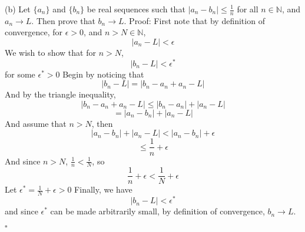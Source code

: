 \documentclass{article}
\begin{document}
(b) Let $\{a_n\}$ and $\{b_n\}$ be real sequences such that $|a_n-b_n| \leq \frac{1}{n}$ for all $n \in \mathbb{N}$, and $a_n \rightarrow L$. Then prove that $b_n \rightarrow L$.
\newline\newline
Proof: First note that by definition of convergence, for $\epsilon > 0$, and $n>N\in \mathbb{N}$,
\[|a_n-L| < \epsilon\]
We wish to show that for $n>N$,
\[|b_n-L| < \epsilon ^*\]
for some $\epsilon ^* > 0$
\newline\newline
Begin by noticing that 
\[|b_n - L| = |b_n - a_n + a_n - L|\]
And by the triangle inequality,
\[|b_n-a_n+a_n-L| \leq |b_n-a_n| + |a_n-L|\]
\[=|a_n-b_n| + |a_n-L|\]
And assume that $n>N$, then
\[|a_n-b_n| + |a_n-L| < |a_n-b_n| + \epsilon \]
\[\leq \frac{1}{n} + \epsilon\]
And since $n>N$, $\frac{1}{n} < \frac{1}{N}$, so
\[\frac{1}{n}+\epsilon < \frac{1}{N} + \epsilon \]
Let $\epsilon ^* = \frac{1}{N} + \epsilon > 0$
\newline\newline
Finally, we have
\[|b_n-L|< \epsilon ^*\]
and since $\epsilon ^*$ can be made arbitrarily small, by definition of convergence, $b_n \rightarrow L$.
\begin{flushright}
    $\square$
\end{flushright}
\end{document}
